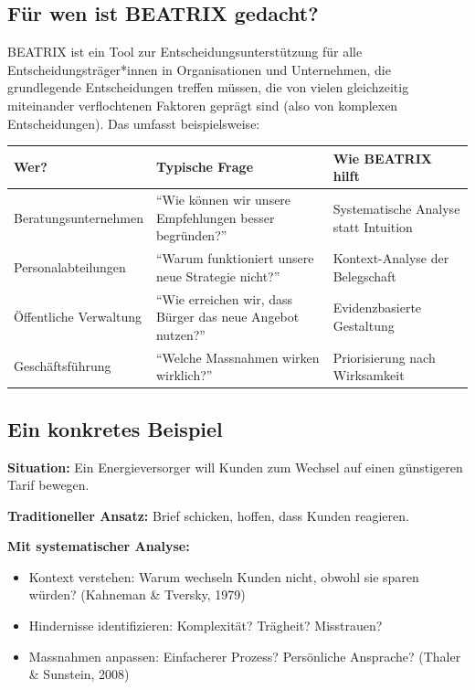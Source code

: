 \documentclass[11pt,a4paper]{article}
\begin{document}
\subsection{Für wen ist BEATRIX gedacht?}

BEATRIX ist ein Tool zur Entscheidungsunterstützung für alle Entscheidungsträger*innen in Organisationen und Unternehmen, die grundlegende Entscheidungen treffen müssen, die von vielen gleichzeitig miteinander verflochtenen Faktoren geprägt sind (also von komplexen Entscheidungen). Das umfasst beispielsweise:

\begin{table}[h]
\centering
\begin{tabular}{@{}L{3.5cm}L{4.5cm}L{5cm}@{}}
\toprule
\textbf{Wer?} & \textbf{Typische Frage} & \textbf{Wie BEATRIX hilft} \\
\midrule
Beratungsunternehmen & ``Wie können wir unsere Empfehlungen besser begründen?'' & Systematische Analyse statt Intuition \\
Personalabteilungen & ``Warum funktioniert unsere neue Strategie nicht?'' & Kontext-Analyse der Belegschaft \\
Öffentliche Verwaltung & ``Wie erreichen wir, dass Bürger das neue Angebot nutzen?'' & Evidenzbasierte Gestaltung \\
Geschäftsführung & ``Welche Massnahmen wirken wirklich?'' & Priorisierung nach Wirksamkeit \\
\bottomrule
\end{tabular}
\end{table}

\subsection{Ein konkretes Beispiel}

\textbf{Situation:} Ein Energieversorger will Kunden zum Wechsel auf einen günstigeren Tarif bewegen.

\textbf{Traditioneller Ansatz:} Brief schicken, hoffen, dass Kunden reagieren.

\textbf{Mit systematischer Analyse:}
\begin{itemize}
    \item Kontext verstehen: Warum wechseln Kunden nicht, obwohl sie sparen würden? (Kahneman \& Tversky, 1979)
    \item Hindernisse identifizieren: Komplexität? Trägheit? Misstrauen?
    \item Massnahmen anpassen: Einfacherer Prozess? Persönliche Ansprache? (Thaler \& Sunstein, 2008)
\end{itemize}
\end{document}
